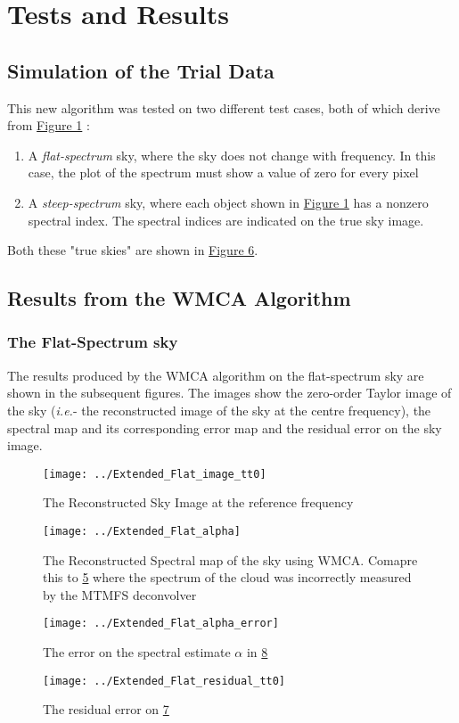 \documentclass[twocolumn]{aastex61}
\begin{document}
\section{Tests and Results}
\subsection{Simulation of the Trial Data}
This new algorithm was tested on two different test cases, both of which derive from \hyperref[ 1]{Figure 1} : 
\begin{enumerate}
\item A \textit{flat-spectrum} sky, where the sky does not change with frequency. In this case, the plot of the spectrum must show a value of zero for every pixel
\item A \textit{steep-spectrum} sky, where each object shown in \hyperref[ 1]{Figure 1} has a nonzero spectral index. The spectral indices are indicated on the true sky image.
\end{enumerate}
Both these "true skies" are shown in \hyperref[ 6]{Figure 6}.
\subsection{Results from the WMCA Algorithm}
\subsubsection{The Flat-Spectrum sky}
The results produced by the WMCA algorithm on the flat-spectrum sky are shown in the subsequent figures. The images show the zero-order Taylor image of the sky (\textit{i.e.}- the reconstructed image of the sky at the centre frequency), the spectral map and its corresponding error map and the residual error on the sky image.
\begin{figure}[H]
\centering
\texttt{[image: ../Extended\_Flat\_image\_tt0]}
\caption{The Reconstructed Sky Image at the reference frequency}
\label{ 7}
\end{figure}
\begin{figure}[H]
\centering
\texttt{[image: ../Extended\_Flat\_alpha]}
\caption{The Reconstructed Spectral map of the sky using WMCA. Comapre this to \hyperref[ 5]{\figurename{ 5}} where the spectrum of the cloud was incorrectly measured by the MTMFS deconvolver}
\label{ 8}
\end{figure}
\begin{figure}[H]
\centering
\texttt{[image: ../Extended\_Flat\_alpha\_error]}
\caption{The error on the spectral estimate $\alpha$ in \hyperref[ 8]{\figurename{ 8}}}
\label{ 9}
\end{figure}
\begin{figure}[H]
\centering
\texttt{[image: ../Extended\_Flat\_residual\_tt0]}
\caption{The residual error on \hyperref[ 7]{\figurename{ 7}}}
\label{ 10}
\end{figure}
\end{document}
